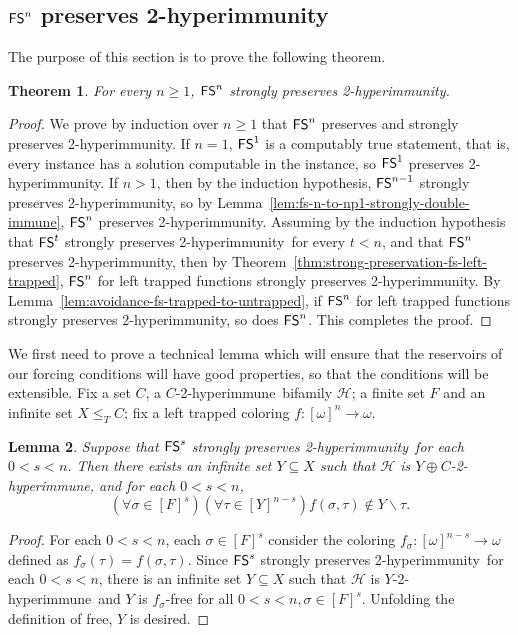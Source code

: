 \documentclass{amsart}
\newtheorem{theorem}{Theorem}[section]
\newtheorem{lemma}[theorem]{Lemma}
\theoremstyle{definition}
\theoremstyle{remark}
\numberwithin{equation}{section}
\theoremstyle{noparens}
\def\propertyL{2-hyperimmunity}
\def\hyper{2-hyperimmune}
\newcommand{\Hcal}{\mathcal{H}}
\renewcommand{\setminus}{\smallsetminus}
\newcommand{\s}[1]{\ensuremath{\sf{#1}}}
\DeclareMathOperator{\fs}{\s{FS}}
\begin{document}
\subsection{
 $\fs^n$ preserves \propertyL
}\label{subsect:fsn-preserves}

The purpose of this section is to prove the following theorem.

\begin{theorem}\label{thm:fs-n-strongly-preserves-double}
For every $n \geq 1$, $\fs^n$ strongly preserves \propertyL.
\end{theorem}
\begin{proof}
We prove by induction over $n \geq 1$ that
$\fs^n$ preserves and strongly preserves \propertyL.
If $n = 1$, $\fs^1$ is a computably true statement, that is, every instance
has a solution computable in the instance, so $\fs^1$ preserves \propertyL.
If $n > 1$, then by the induction hypothesis, $\fs^{n-1}$ strongly preserves \propertyL,
so by Lemma~\ref{lem:fs-n-to-np1-strongly-double-immune}, $\fs^n$ preserves \propertyL.
Assuming by the induction hypothesis that $\fs^t$ strongly preserves \propertyL\
for every $t < n$, and that $\fs^n$ preserves \propertyL,
then by Theorem~\ref{thm:strong-preservation-fs-left-trapped},
$\fs^n$ for left trapped functions strongly preserves \propertyL.
By Lemma~\ref{lem:avoidance-fs-trapped-to-untrapped}, if $\fs^n$ for left trapped functions strongly preserves \propertyL,
so does $\fs^n$. This completes the proof.
\end{proof}

We first need to prove a technical lemma which will ensure that the reservoirs of our forcing conditions
will have good properties, so that the conditions will be extensible.
Fix a set $C$, a $C$-\hyper\ bifamily $\Hcal$; a finite set $F$ and an infinite set $X \leq_T C$;
fix a left trapped coloring $f : [\omega]^n \to \omega$.
\begin{lemma}\label{lem:fs-left-trapped-preserves-smaller}
Suppose that $\fs^s$ strongly preserves \propertyL\ for each $0<s<n$.
Then there exists an infinite
set $Y \subseteq X$ such that $\Hcal$ is $Y \oplus C$-\hyper, and for each $0<s<n$,
$$
(\forall \sigma \in [F]^s)(\forall \tau \in [Y]^{n-s})f(\sigma, \tau) \not \in Y \setminus \tau.
$$
\end{lemma}
\begin{proof}

For each $0<s<n$, each $\sigma\in [F]^s$ consider the coloring
$f_\sigma:[\omega]^{n-s}\rightarrow\omega$ defined as $f_\sigma(\tau) = f(\sigma,\tau)$.
Since  $\fs^s$ strongly preserves \propertyL\ for each $0<s<n$,
there is an infinite
set $Y \subseteq X$ such that $\Hcal$ is $Y$-\hyper\
and $Y$ is $f_\sigma$-free for all $0<s<n,\sigma\in [F]^s$.
Unfolding the definition of free, $Y$ is desired.
\end{proof}
\end{document}
